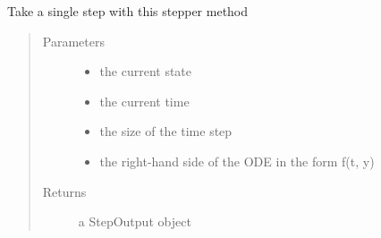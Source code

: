 \documentclass[letterpaper,10pt,english]{sphinxmanual}
\begin{document}
\begin{fulllineitems}
\begin{fulllineitems}
\label{\detokenize{spitfire.time.methods:spitfire.time.methods.GeneralAdaptiveExplicitRungeKutta.single_step}}
Take a single step with this stepper method
\begin{quote}\begin{description}
\item[{Parameters}] \leavevmode\begin{itemize}
\item {} 
 \textendash{} the current state

\item {} 
 \textendash{} the current time

\item {} 
 \textendash{} the size of the time step

\item {} 
 \textendash{} the right-hand side of the ODE in the form f(t, y)

\end{itemize}

\item[{Returns}] \leavevmode
a StepOutput object

\end{description}\end{quote}

\end{fulllineitems}


\end{fulllineitems}

\end{document}
